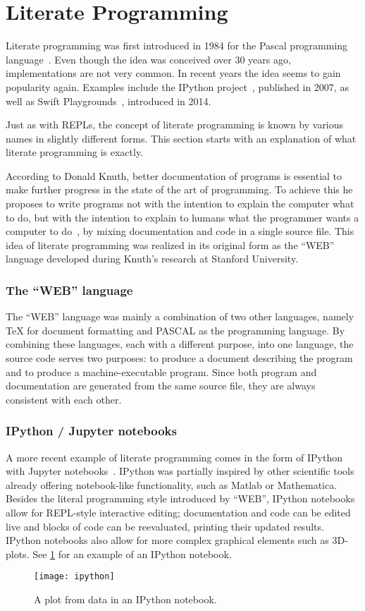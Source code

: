 \section{Literate Programming}
\label{sec:literate-programming}

Literate programming was first introduced in 1984 for the Pascal programming
language~\cite{knuth1984}. Even though the idea was conceived over 30 years
ago, implementations are not very common. In recent years the idea seems to
gain popularity again. Examples include the IPython project~\cite{ipython2007},
published in 2007, as well as Swift Playgrounds~\cite{swift-playgrounds},
introduced in 2014.

Just as with REPLs, the concept of literate programming is known by various
names in slightly different forms. This section starts with an explanation of
what literate programming is exactly.

According to Donald Knuth, better documentation of programs is essential to make
further progress in the state of the art of programming.
To achieve this he proposes to write programs not with the intention to
explain the computer what to do, but with the intention to explain to humans
what the programmer wants a computer to do~\cite{knuth1984},
by mixing documentation and code in a single source file.
This idea of literate programming was realized in its original form as the
``WEB'' language developed during Knuth's research at Stanford University.

\subsubsection{The ``WEB'' language}

The ``WEB'' language was mainly a combination of two other languages, namely
\TeX{} for document formatting and PASCAL as the programming language. By
combining these languages, each with a different purpose, into one language, the
source code serves two purposes: to produce a document describing the program
and to produce a machine-executable program. Since both program and
documentation are generated from the same source file, they are always
consistent with each other.

\subsubsection{IPython / Jupyter notebooks}

A more recent example of literate programming comes in the form of IPython with
Jupyter notebooks~\cite{ipython2007}. IPython was partially inspired by other
scientific tools already offering notebook-like functionality, such as Matlab or
Mathematica. Besides the literal programming style introduced by ``WEB'', IPython
notebooks allow for REPL-style interactive editing; documentation and code can
be edited live and blocks of code can be reevaluated, printing their updated
results. IPython notebooks also allow for more complex graphical elements such
as 3D-plots. See \cref{fig:ipython} for an example of an IPython notebook.

\begin{figure}[htb]
  \centering
  \texttt{[image: ipython]}
  \caption{A plot from data in an IPython notebook.}
  \label{fig:ipython}
\end{figure}


